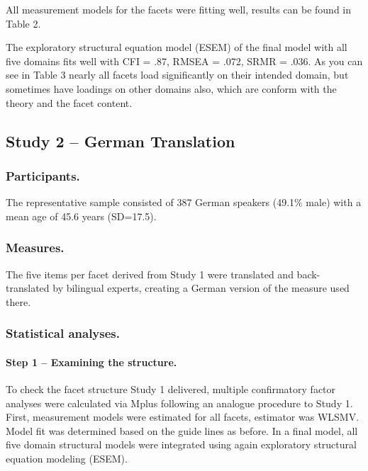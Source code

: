 \documentclass[man]{apa6}
\theoremstyle{definition}
\theoremstyle{definition}
\theoremstyle{definition}
\theoremstyle{remark}
\begin{document}
All measurement models for the facets were fitting well, results can be
found in Table 2.

The exploratory structural equation model (ESEM) of the final model with
all five domains fits well with CFI = .87, RMSEA = .072, SRMR = .036. As
you can see in Table 3 nearly all facets load significantly on their
intended domain, but sometimes have loadings on other domains also,
which are conform with the theory and the facet content.

\hypertarget{study-2-german-translation}{%
\subsection{Study 2 -- German
Translation}\label{study-2-german-translation}}

\hypertarget{participants.-1}{%
\subsubsection{Participants.}\label{participants.-1}}

The representative sample consisted of 387 German speakers (49.1\% male)
with a mean age of 45.6 years (SD=17.5).

\hypertarget{measures.-1}{%
\subsubsection{Measures.}\label{measures.-1}}

The five items per facet derived from Study 1 were translated and
back-translated by bilingual experts, creating a German version of the
measure used there.

\hypertarget{statistical-analyses.-1}{%
\subsubsection{Statistical analyses.}\label{statistical-analyses.-1}}

\hypertarget{step-1-examining-the-structure.}{%
\paragraph{Step 1 -- Examining the
structure.}\label{step-1-examining-the-structure.}}

To check the facet structure Study 1 delivered, multiple confirmatory
factor analyses were calculated via Mplus following an analogue
procedure to Study 1. First, measurement models were estimated for all
facets, estimator was WLSMV. Model fit was determined based on the guide
lines as before. In a final model, all five domain structural models
were integrated using again exploratory structural equation modeling
(ESEM).
\end{document}
